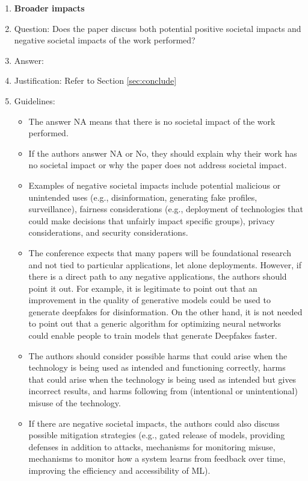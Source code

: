 \documentclass{article}
\begin{document}
\begin{enumerate}
\item {\bf Broader impacts}
    \item[] Question: Does the paper discuss both potential positive societal impacts and negative societal impacts of the work performed?
    \item[] Answer: \answerYes{} %
    \item[] Justification: Refer to Section \ref{sec:conclude}
    \item[] Guidelines:
    \begin{itemize}
        \item The answer NA means that there is no societal impact of the work performed.
        \item If the authors answer NA or No, they should explain why their work has no societal impact or why the paper does not address societal impact.
        \item Examples of negative societal impacts include potential malicious or unintended uses (e.g., disinformation, generating fake profiles, surveillance), fairness considerations (e.g., deployment of technologies that could make decisions that unfairly impact specific groups), privacy considerations, and security considerations.
        \item The conference expects that many papers will be foundational research and not tied to particular applications, let alone deployments. However, if there is a direct path to any negative applications, the authors should point it out. For example, it is legitimate to point out that an improvement in the quality of generative models could be used to generate deepfakes for disinformation. On the other hand, it is not needed to point out that a generic algorithm for optimizing neural networks could enable people to train models that generate Deepfakes faster.
        \item The authors should consider possible harms that could arise when the technology is being used as intended and functioning correctly, harms that could arise when the technology is being used as intended but gives incorrect results, and harms following from (intentional or unintentional) misuse of the technology.
        \item If there are negative societal impacts, the authors could also discuss possible mitigation strategies (e.g., gated release of models, providing defenses in addition to attacks, mechanisms for monitoring misuse, mechanisms to monitor how a system learns from feedback over time, improving the efficiency and accessibility of ML).
    \end{itemize}
    

\end{enumerate}
\end{document}
